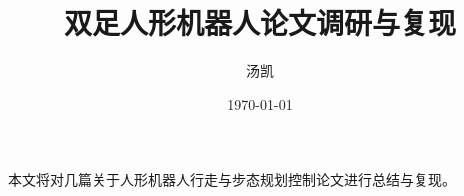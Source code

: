 \documentclass{ctexart}
\title{双足人形机器人论文调研与复现}
\author{汤凯}
\date{\today}
\begin{document}
    \maketitle
    本文将对几篇关于人形机器人行走与步态规划控制论文进行总结与复现。

    
    
    
\end{document}
